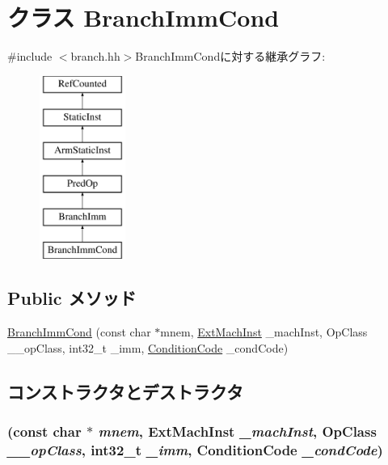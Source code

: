 \hypertarget{classArmISA_1_1BranchImmCond}{
\section{クラス BranchImmCond}
\label{classArmISA_1_1BranchImmCond}
}


{\ttfamily \#include $<$branch.hh$>$}BranchImmCondに対する継承グラフ:\begin{figure}[H]
\begin{center}
\leavevmode
\includegraphics[height=6cm]{classArmISA_1_1BranchImmCond}
\end{center}
\end{figure}
\subsection*{Public メソッド}
\begin{DoxyCompactItemize}
\item 
\hyperlink{classArmISA_1_1BranchImmCond_a00a4e16e9489f02d32a2ce4df99e6ff2}{BranchImmCond} (const char $\ast$mnem, \hyperlink{classStaticInst_a5605d4fc727eae9e595325c90c0ec108}{ExtMachInst} \_\-machInst, OpClass \_\-\_\-opClass, int32\_\-t \_\-imm, \hyperlink{namespaceArmISA_ab8f08e777c4753720cff841f81da8e06}{ConditionCode} \_\-condCode)
\end{DoxyCompactItemize}


\subsection{コンストラクタとデストラクタ}
\hypertarget{classArmISA_1_1BranchImmCond_a00a4e16e9489f02d32a2ce4df99e6ff2}{
\subsubsection[{BranchImmCond}]{ (const char $\ast$ {\em mnem}, \/  {\bf ExtMachInst} {\em \_\-machInst}, \/  OpClass {\em \_\-\_\-opClass}, \/  int32\_\-t {\em \_\-imm}, \/  {\bf ConditionCode} {\em \_\-condCode})}}
\label{classArmISA_1_1BranchImmCond_a00a4e16e9489f02d32a2ce4df99e6ff2}



